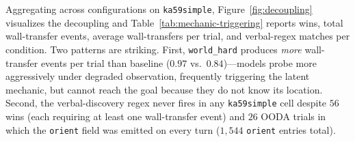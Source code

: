 \documentclass{article}
\begin{document}
Aggregating across configurations on \texttt{ka59simple}, Figure~\ref{fig:decoupling} visualizes the decoupling and Table~\ref{tab:mechanic-triggering} reports wins, total wall-transfer events, average wall-transfers per trial, and verbal-regex matches per condition. Two patterns are striking. First, \texttt{world\_hard} produces \emph{more} wall-transfer events per trial than baseline ($0.97$ vs.\ $0.84$)---models probe more aggressively under degraded observation, frequently triggering the latent mechanic, but cannot reach the goal because they do not know its location. Second, the verbal-discovery regex never fires in any \texttt{ka59simple} cell despite $56$ wins (each requiring at least one wall-transfer event) and $26$ OODA trials in which the \texttt{orient} field was emitted on every turn ($1{,}544$ \texttt{orient} entries total).
\end{document}
